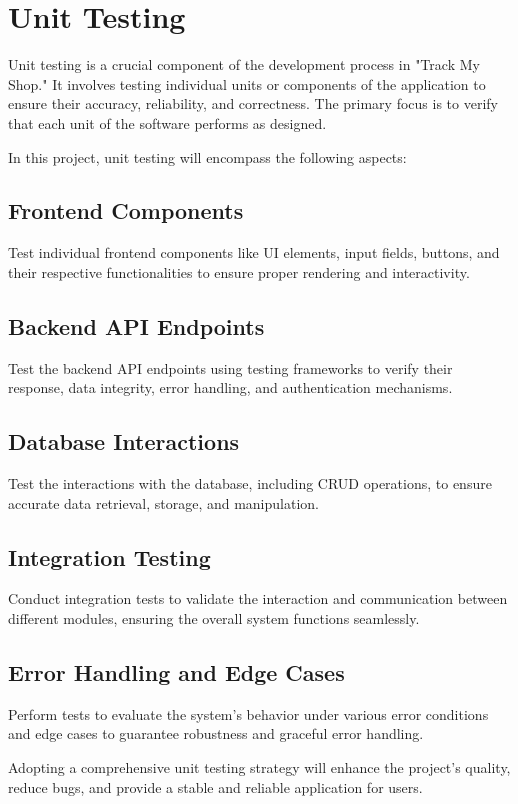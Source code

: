 \section{Unit Testing}

Unit testing is a crucial component of the development process in "Track My Shop." It involves testing individual units or components of the application to ensure their accuracy, reliability, and correctness. The primary focus is to verify that each unit of the software performs as designed.

In this project, unit testing will encompass the following aspects:

\subsection{Frontend Components} Test individual frontend components like UI elements, input fields, buttons, and their respective functionalities to ensure proper rendering and interactivity.
	
\subsection{Backend API Endpoints} Test the backend API endpoints using testing frameworks to verify their response, data integrity, error handling, and authentication mechanisms.
	
\subsection{Database Interactions} Test the interactions with the database, including CRUD operations, to ensure accurate data retrieval, storage, and manipulation.
	
\subsection{Integration Testing} Conduct integration tests to validate the interaction and communication between different modules, ensuring the overall system functions seamlessly.
	
\subsection{Error Handling and Edge Cases} Perform tests to evaluate the system's behavior under various error conditions and edge cases to guarantee robustness and graceful error handling.


Adopting a comprehensive unit testing strategy will enhance the project's quality, reduce bugs, and provide a stable and reliable application for users.

